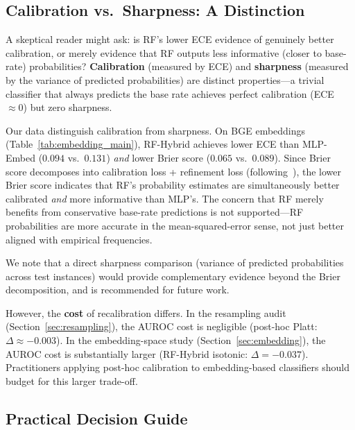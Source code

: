 \documentclass[11pt]{article}
\begin{document}
\subsection{Calibration vs.\ Sharpness: A Distinction}

A skeptical reader might ask: is RF's lower ECE evidence of genuinely better calibration, or merely evidence that RF outputs less informative (closer to base-rate) probabilities? \textbf{Calibration} (measured by ECE) and \textbf{sharpness} (measured by the variance of predicted probabilities) are distinct properties---a trivial classifier that always predicts the base rate achieves perfect calibration (ECE $\approx 0$) but zero sharpness.

Our data distinguish calibration from sharpness. On BGE embeddings (Table~\ref{tab:embedding_main}), RF-Hybrid achieves lower ECE than MLP-Embed ($0.094$ vs.\ $0.131$) \textit{and} lower Brier score ($0.065$ vs.\ $0.089$). Since Brier score decomposes into calibration loss + refinement loss (following~\cite{guo2017calibration}), the lower Brier score indicates that RF's probability estimates are simultaneously better calibrated \textit{and} more informative than MLP's. The concern that RF merely benefits from conservative base-rate predictions is not supported---RF probabilities are more accurate in the mean-squared-error sense, not just better aligned with empirical frequencies.

We note that a direct sharpness comparison (variance of predicted probabilities across test instances) would provide complementary evidence beyond the Brier decomposition, and is recommended for future work.

However, the \textbf{cost} of recalibration differs. In the resampling audit (Section~\ref{sec:resampling}), the AUROC cost is negligible (post-hoc Platt: $\Delta \approx -0.003$). In the embedding-space study (Section~\ref{sec:embedding}), the AUROC cost is substantially larger (RF-Hybrid isotonic: $\Delta = -0.037$). Practitioners applying post-hoc calibration to embedding-based classifiers should budget for this larger trade-off.

\subsection{Practical Decision Guide}
\end{document}

